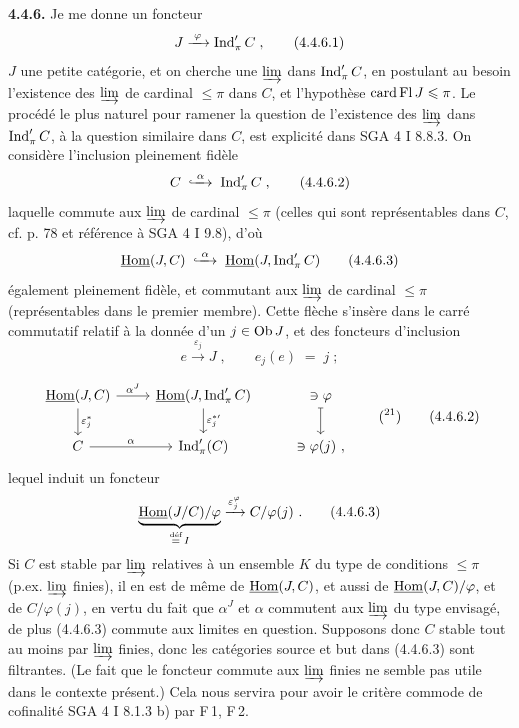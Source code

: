 \textbf{4.4.6.} Je me donne un foncteur %
\[
J \xrightarrow{\;\varphi\;} \Ind'_\pi C \;, \tag*{(4.4.6.1)}
\]
$J$ une petite catégorie, et on cherche une $\varinjlim$ dans $\operatorname{Ind}'_\pi C$, en postulant au besoin l'existence des $\varinjlim$ de cardinal $\leqslant \pi$ dans $C$, et l'hypothèse $\operatorname{card}\operatorname{Fl} J \leqslant \pi$. Le procédé le plus naturel pour ramener la question de l'existence des $\varinjlim$ dans $\operatorname{Ind}'_\pi C$, à la question similaire dans $C$, est explicité dans SGA 4 I 8.8.3. On considère l'inclusion pleinement fidèle
\[
C \;\hookxrightarrow{\;\alpha\;}\; \Ind'_\pi C \;, \tag*{(4.4.6.2)}
\]
laquelle commute aux $\varinjlim$ de cardinal $\leqslant \pi$ (celles qui sont représentables dans $C$, cf. p. 78 et référence à SGA 4 I 9.8), d'où
\[
\uHom(J,C) \;\hookxrightarrow{\;\alpha\;}\; \uHom(J,\Ind'_\pi C) \tag*{(4.4.6.3)}
\]
également pleinement fidèle, et commutant aux $\varinjlim$ de cardinal $\leqslant \pi$ (représentables dans le premier membre). Cette flèche s'insère dans le carré commutatif relatif à la donnée d'un $j \in \mathrm{Ob}\, J$, et des foncteurs d'inclusion
\[
e \xrightarrow{\;\varepsilon_j\;} J \;, \qquad e_j(e) \;=\; j \;; \tag*{(4.4.6.4)} %
\]


\[
\begin{tikzcd}
\uHom(J,C) \arrow[r, "\alpha^J"] \arrow[d, "\varepsilon_j^*"] & \uHom(J,\Ind'_\pi C) \arrow[d, "{\varepsilon_j^{*\prime}}"] & \ni \varphi \arrow[d, mapsto] \\
C \arrow[r, "\alpha"] & \Ind'_\pi(C) & \ni \varphi(j)\ ,
\end{tikzcd}
\qquad (\text{\footnotemark[21]})
\tag*{(4.4.6.2)}
\]
lequel induit un foncteur
\[
\underbrace{\uHom(J/C)/\varphi}_{\overset{\text{déf}}{=}\, I} \xrightarrow{\varepsilon_j^\varphi} C/\varphi(j)\ . \tag*{(4.4.6.3)} %
\]
Si $C$ est stable par $\varinjlim$ relatives à un ensemble $K$ du type de conditions $\leqslant \pi$ (p.ex. $\varinjlim$ finies), il en est de même de $\underline{\mathrm{Hom}}(J,C)$, et aussi de $\underline{\mathrm{Hom}}(J,C)/\varphi$, et de $C/\varphi(j)$, en vertu du fait que $\alpha^J$ et $\alpha$ commutent aux $\varinjlim$ du type envisagé, de plus (4.4.6.3) commute aux limites en question. Supposons donc $C$ stable tout au moins par $\varinjlim$ finies, donc les catégories source et but dans (4.4.6.3) sont filtrantes. (Le fait que le foncteur commute aux $\varinjlim$ finies ne semble pas utile dans le contexte présent.) Cela nous servira pour avoir le critère commode de cofinalité SGA 4 I 8.1.3 b) par F\,1, F\,2.

